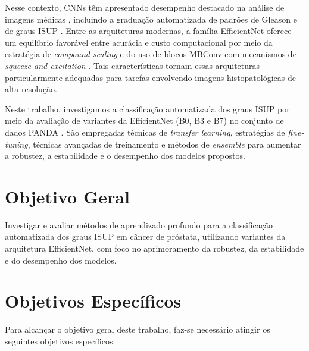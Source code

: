 Nesse contexto, CNNs têm apresentado desempenho destacado na análise de imagens médicas \cite{ref-campanella2019}, incluindo a graduação automatizada de padrões de Gleason e de graus ISUP \cite{ref-nagpal2019,ref-bulten2020}. Entre as arquiteturas modernas, a família EfficientNet \cite{ref-tan2019} oferece um equilíbrio favorável entre acurácia e custo computacional por meio da estratégia de \textit{compound scaling} e do uso de blocos MBConv com mecanismos de \textit{squeeze-and-excitation} \cite{ref-hu2018}. Tais características tornam essas arquiteturas particularmente adequadas para tarefas envolvendo imagens histopatológicas de alta resolução.

Neste trabalho, investigamos a classificação automatizada dos graus ISUP por meio da avaliação de variantes da EfficientNet (B0, B3 e B7) no conjunto de dados PANDA \cite{ref-panda2020}. São empregadas técnicas de \textit{transfer learning}, estratégias de \textit{fine-tuning}, técnicas avançadas de treinamento e métodos de \textit{ensemble} para aumentar a robustez, a estabilidade e o desempenho dos modelos propostos.

\section{Objetivo Geral}
\label{sec:objetivo-geral}

Investigar e avaliar métodos de aprendizado profundo para a classificação automatizada dos graus ISUP em câncer de próstata, utilizando variantes da arquitetura EfficientNet, com foco no aprimoramento da robustez, da estabilidade e do desempenho dos modelos.

\section{Objetivos Específicos}
\label{sec:objetivos-especificos}

Para alcançar o objetivo geral deste trabalho, faz-se necessário atingir os seguintes objetivos específicos:

